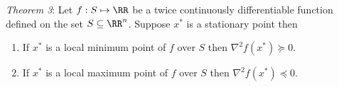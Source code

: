 \documentclass[12pt,a4paper]{article}
\begin{document}
		\textit{Theorem 3}: Let $f : S \mapsto \RR$ be a twice continuously differentiable function defined on the set 
		$S \subseteq \RR^n$. Suppose $x^*$ is a stationary point then
		\begin{enumerate}[i:]
			\item If $x^*$ is a local minimum point of $f$ over $S$ then $\nabla^2f(x^*) \succeq 0 $.
			\item If $x^*$ is a local maximum point of $f$ over $S$ then $\nabla^2f(x^*) \preceq 0 $.
		\end{enumerate} 
		
		
		
		
			
		
		
		
\end{document}
